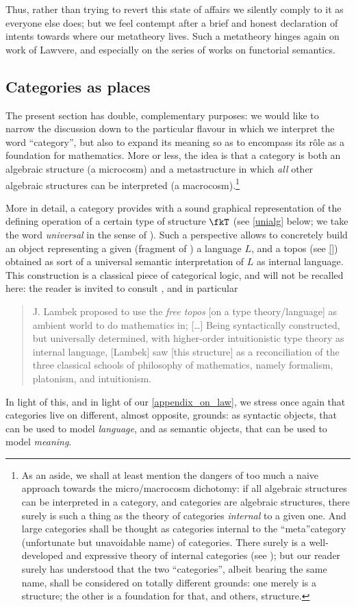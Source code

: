 Thus, rather than trying to revert this state of affairs we silently comply to it as everyone else does; but we feel contempt after a brief and honest declaration of intents towards where our metatheory lives. Such a metatheory hinges again on work of Lawvere, and especially on the series of works on functorial semantics.
\subsection{Categories as places}
The present section has double, complementary purposes: we would like to narrow the discussion down to the particular flavour in which we interpret the word ``category'', but also to expand its meaning so as to encompass its r\^ole as a foundation for mathematics. More or less, the idea is that a category is both an algebraic structure (a microcosm) and a metastructure in which \emph{all} other algebraic structures can be interpreted (a macrocosm).\footnote{As an aside, we shall at least mention the dangers of too much a naive approach towards the micro/macrocosm dichotomy: if all algebraic structures can be interpreted in a category, and categories are algebraic structures, there surely is such a thing as the theory of categories \emph{internal} to a given one. And large categories shall be thought as categories internal to the ``meta''category (unfortunate but unavoidable name) of categories. There surely is a well-developed and expressive theory of internal categories (see \cite{internalcat,reference}); but our reader surely has understood that the two ``categories'', albeit bearing the same name, shall be considered on totally different grounds: one merely is a structure; the other is a foundation for that, and others, structure.}

More in detail, a category provides with a sound graphical representation of the defining operation of a certain type of structure $\fkT$ (see \autoref{unialg} below; we take the word \emph{universal} in the sense of \cite{Kurosh:o:altri}).
Such a perspective allows to concretely build an object representing a given (fragment of ) a language $L$, and a topos (see \autoref{}) obtained as sort of a universal semantic interpretation of $L$ as internal language. This construction is a classical piece of categorical logic, and will not be recalled here: the reader is invited to consult \cite[II.12, 13, 14]{lambek1988introduction}, and in particular
\begin{quote}
	J. Lambek proposed to use the \emph{free topos} [on a type theory/language] as ambient world to do mathematics in; [\dots\unkern] Being syntactically constructed, but universally determined, with higher-order intuitionistic type theory as internal language, [Lambek] saw [this structure] as a reconciliation of the three classical schools of philosophy of mathematics, namely formalism, platonism, and intuitionism.
\end{quote}
In light of this, and in light of our \autoref{appendix_on_law}, we stress once again that categories live on different, almost opposite, grounds: as syntactic objects, that can be used to model \emph{language}, and as semantic objects, that can be used to model \emph{meaning}.

